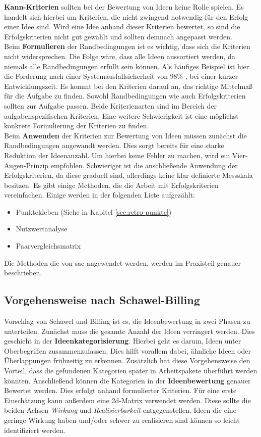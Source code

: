 \textbf{Kann-Kriterien} sollten bei der Bewertung von Ideen keine Rolle spielen. Es handelt sich hierbei 
um Kriterien, die nicht zwingend notwendig für den Erfolg einer Idee sind. Wird eine Idee anhand dieser Kriterien 
bewertet, so sind die Erfolgskriterien nicht gut gewählt und sollten demnach angepasst werden.\\

Beim \textbf{Formulieren} der Randbedingungen ist es wichtig, dass sich die Kriterien nicht
widersprechen. Die Folge wäre, dass alle Ideen aussortiert werden, da niemals alle Randbedingungen erfüllt sein können.
Als häufiges Beispiel ist hier die Forderung nach einer Systemausfallsicherheit von 98\% , bei einer
kurzer Entwicklungszeit. 
Es kommt bei den Kriterien darauf an, das richtige Mittelmaß für die Aufgabe zu finden. 
Sowohl Randbedingungen wie auch Erfolgskriterien sollten zur Aufgabe passen. Beide Kriterienarten sind im 
Bereich der aufgabenspezifischen Kriterien. Eine weitere Schwierigkeit ist eine möglichst konkrete
Formulierung der Kriterien zu finden. \\

Beim \textbf{Anwenden} der Kriterien zur Bewertung von Ideen müssen zunächst die Randbedingungen angewandt werden. 
Dies sorgt bereits für eine starke Reduktion der Ideenanzahl. Um hierbei keine Fehler zu machen, wird 
ein Vier-Augen-Prinzip empfohlen. 
Schwieriger ist die anschließende Anwendung der Erfolgskriterien, da diese graduell sind, allerdings keine klar 
definierte Messskala besitzen. 
Es gibt einige Methoden, die die Arbeit mit Erfolgskriterien vereinfachen. Einige werden 
in der folgenden Liste aufgezählt: 
\begin{itemize}
    \item Punktekleben (Siehe in Kapitel \ref{sec:retro-punkte})
    \item Nutzwertanalyse
    \item Paarvergleichsmatrix
\end{itemize}
Die Methoden die von \ac{sac} angewendet werden, werden im Praxisteil genauer beschrieben. \cite{zephram:2018}

\subsection{Vorgehensweise nach Schawel-Billing}
Vorschlag von Schawel und Billing ist es, die Ideenbewertung in zwei Phasen zu unterteilen. Zunächst muss die gesamte Anzahl 
der Ideen verringert werden. Dies geschieht in der \textbf{Ideenkategorisierung}. Hierbei geht es darum, Ideen unter 
Oberbegriffen zusammenzufassen. Dies hilft vorallem dabei, ähnliche Ideen oder Überlappungen frühzeitig zu erkennen.
Zusätzlich hat diese Vorgehensweise den Vorteil, dass die gefundenen Kategorien später in Arbeitspakete überführt werden 
könnten. Anschließend können die Kategorien in der \textbf{Ideenbewertung} genauer Bewertet werden. 
Dies erfolgt anhand formulierter Kriterien. Für eine erste Einschätzung kann außerdem eine \ac{2d}-Matrix verwendet werden. 
Diese sollte die beiden Achsen \textit{Wirkung} und \textit{Realisierbarkeit} entgegenstellen. Ideen die eine geringe Wirkung haben und/oder 
schwer zu realisieren sind können so leicht identifiziert werden. \cite{schawel:2009}